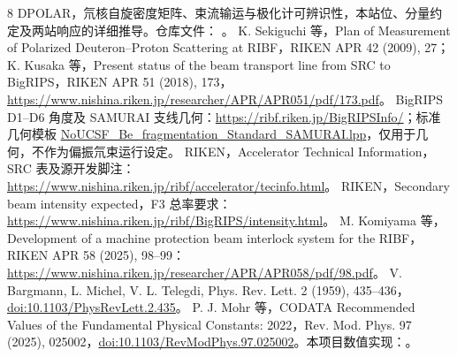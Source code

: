 \documentclass[UTF8,11pt,a4paper,fontset=none]{ctexart}
\begin{document}
\begingroup\footnotesize
\setlength{\parskip}{0pt}
\begin{thebibliography}{8}
\setlength{\itemsep}{3pt}
 DPOLAR，氘核自旋密度矩阵、束流输运与极化计可辨识性，本站位、分量约定及两站响应的详细推导。仓库文件：
。
 K. Sekiguchi 等，Plan of Measurement of Polarized Deuteron--Proton Scattering at RIBF，RIKEN APR 42 (2009), 27；K. Kusaka 等，Present status of the beam transport line from SRC to BigRIPS，RIKEN APR 51 (2018), 173，\url{https://www.nishina.riken.jp/researcher/APR/APR051/pdf/173.pdf}。
BigRIPS D1--D6 角度及 SAMURAI 支线几何：\url{https://ribf.riken.jp/BigRIPSInfo/}；标准几何模板 \href{https://ribf.riken.jp/BigRIPSInfo/lise/NoUCSF_Be_fragmentation_Standard_SAMURAI.lpp}{NoUCSF\_Be\_fragmentation\_Standard\_SAMURAI.lpp}，仅用于几何，不作为偏振氘束运行设定。
 RIKEN，Accelerator Technical Information，SRC 表及源开发脚注：\url{https://www.nishina.riken.jp/ribf/accelerator/tecinfo.html}。
 RIKEN，Secondary beam intensity expected，F3 总率要求：\url{https://www.nishina.riken.jp/ribf/BigRIPS/intensity.html}。
 M. Komiyama 等，Development of a machine protection beam interlock system for the RIBF，RIKEN APR 58 (2025), 98--99：\url{https://www.nishina.riken.jp/researcher/APR/APR058/pdf/98.pdf}。
 V. Bargmann, L. Michel, V. L. Telegdi, Phys. Rev. Lett. 2 (1959), 435--436，\href{https://doi.org/10.1103/PhysRevLett.2.435}{doi:10.1103/PhysRevLett.2.435}。
 P. J. Mohr 等，CODATA Recommended Values of the Fundamental Physical Constants: 2022，Rev. Mod. Phys. 97 (2025), 025002，\href{https://doi.org/10.1103/RevModPhys.97.025002}{doi:10.1103/RevModPhys.97.025002}。本项目数值实现：。
\end{thebibliography}
\endgroup
\end{document}
